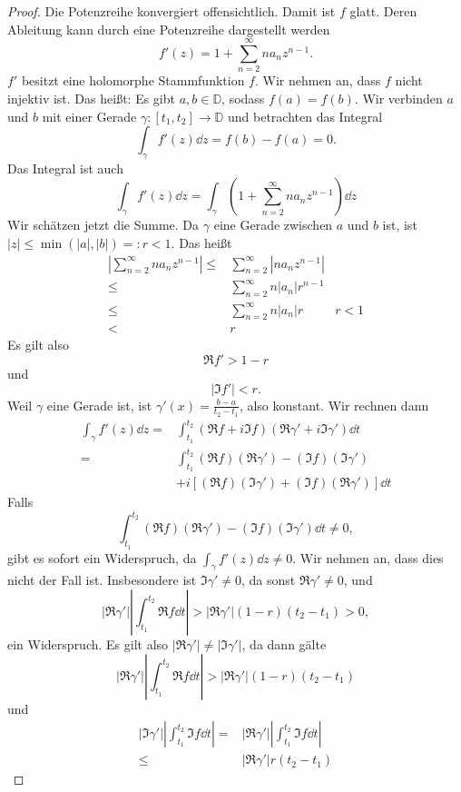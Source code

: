 \begin{proof}
	Die Potenzreihe konvergiert offensichtlich. Damit ist $f$ glatt. Deren Ableitung kann durch eine Potenzreihe dargestellt werden
	\[
	f'(z)=1+\sum_{n=2}^\infty n a_n z^{n-1}
	.\] 
	$f'$ besitzt eine holomorphe Stammfunktion $f$. Wir nehmen an, dass $f$ nicht injektiv ist. Das heißt: Es gibt $a,b\in \mathbb{D}$, sodass $f(a)=f(b)$. Wir verbinden $a$ und $b$ mit einer Gerade $\gamma:[t_1,t_2]\to \mathbb{D}$ und betrachten das Integral
	\[
	\int_\gamma f'(z)\dd{z}=f(b)-f(a)=0
	.\] 
	Das Integral ist auch
	\[
		\int_\gamma f'(z)\dd{z} =\int_\gamma \left( 1+\sum_{n=2}^\infty n a_n z^{n-1} \right)\dd{z}
		\]
	Wir schätzen jetzt die Summe. Da $\gamma$ eine Gerade zwischen $a$ und $b$ ist, ist $|z|\le \min(|a|,|b|)=:r<1$. Das heißt
	\begin{align*}
		\left| \sum_{n=2}^\infty n a_n z^{n-1} \right| \le& \sum_{n=2}^\infty \left|n a_n z^{n-1}\right|\\
		\le& \sum_{n=2}^\infty n |a_n| r^{n-1}\\
		\le& \sum_{n=2}^\infty n |a_n| r & r < 1 \\
		<&r
	\end{align*}
	Es gilt also
	\[
	\Re f' > 1 - r
	\]
	und
	\[
	|\Im f'|<r
	.\] 
	Weil $\gamma$ eine Gerade ist, ist $\gamma'(x) = \frac{b-a}{t_2-t_1}$, also konstant. Wir rechnen dann
	\begin{align*}
		\int_\gamma f'(z)\dd{z}=& \int_{t_1}^{t_2} (\Re f + i\Im f)(\Re \gamma' +i\Im \gamma')\dd{t}\\
		=&\int_{t_1}^{t_2}(\Re f)(\Re \gamma')-(\Im f)(\Im \gamma')\\
		&+i\left[(\Re f)(\Im \gamma')+(\Im f)(\Re \gamma') \right] \dd{t}
	\end{align*}
	Falls
	\[
	\int_{t_1}^{t_2} (\Re f)(\Re \gamma') - (\Im f)(\Im \gamma')\dd{t}\neq 0
	,\]
	gibt es sofort ein Widerspruch, da $\int_\gamma f'(z)\dd{z} \neq 0$. Wir nehmen an, dass dies nicht der Fall ist. Insbesondere ist $\Im\gamma'\neq 0$, da sonst $\Re\gamma'\neq 0$, und
	\[
	\left|\Re\gamma'\right| \left|\int_{t_1}^{t_2}\Re f\dd{t}\right|> |\Re\gamma'|(1-r)(t_2-t_1)>0
	,\]
	ein Widerspruch. Es gilt also $|\Re\gamma'|\neq |\Im\gamma'|$, da dann gälte
	\[
	|\Re\gamma'|\left|\int_{t_1}^{t_2}\Re f\dd{t}\right|> |\Re\gamma'|(1-r)(t_2-t_1)
	\]
	und
	\begin{align*}
		|\Im\gamma'|\left| \int_{t_1}^{t_2}\Im f\dd{t} \right| =&|\Re\gamma'|\left| \int_{t_1}^{t_2}\Im f\dd{t} \right| \\
		\le& |\Re \gamma'|r(t_2-t_1)
	\end{align*}

\end{proof}
